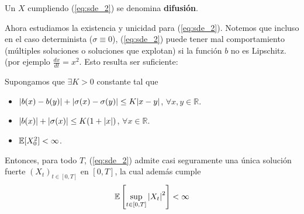 Un $X$ cumpliendo (\ref{eq:sde_2}) se denomina \textbf{difusión}. 

Ahora estudiamos la existencia y unicidad  para (\ref{eq:sde_2}). Notemos que incluso en el caso determinista
($\sigma \equiv 0$), (\ref{eq:sde_2}) puede tener mal comportamiento (múltiples soluciones o soluciones 
que explotan) si la función $b$ no es Lipschitz. (por ejemplo $\frac{dx}{dt} = x^2$. Esto resulta ser 
suficiente:

\begin{theorem}
        Supongamos que $\exists K >0$ constante tal que 
        \begin{itemize}
                \item $\abs{b(x) - b(y)} + \abs{\sigma(x)- \sigma(y)} \le  K \abs{x-y}$, 
                        $\forall x,y \in \mathbb{R}$. 
                \item $\abs{b(x)} + \abs{\sigma(x)} \le K(1+\abs{x})$, $\forall x \in \mathbb{R}$. 
                \item $\mathbb{E}[X_{0}^{2}] < \infty$. 
        \end{itemize}
        Entonces, para todo $T$, (\ref{eq:sde_2}) admite casi seguramente una única solución fuerte 
        $(X_t)_{t \in [0,T]}$ en $[0,T]$, la cual además cumple 
        \begin{equation*}
                \mathbb{E} \left[ \sup_{t \in [0,T]} \abs{X_t}^2 \right] < \infty
        \end{equation*}
\end{theorem}

